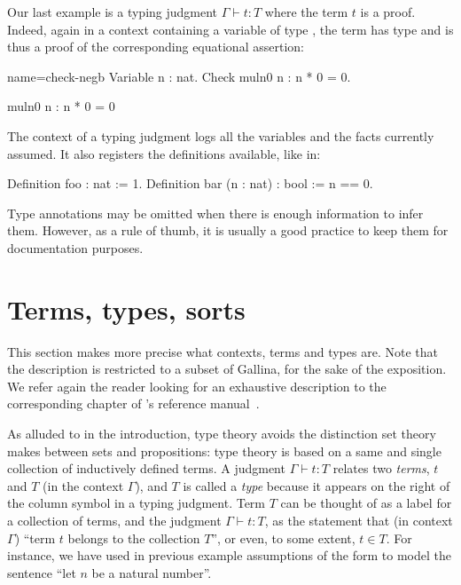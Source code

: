 Our last example is a typing judgment  $\Gamma \vdash t : T$ where
the term $t$ is a proof. Indeed, again in a context containing a
variable  of type , the term
 has type  and is thus a proof of the
corresponding equational assertion:

\begin{coq-left}{name=check-negb}{}
Variable n : nat.
Check muln0 n : n * 0 = 0.

\end{coq-left}
\begin{coqout-right}
muln0 n : n * 0 = 0
\end{coqout-right}

The context of a typing judgment logs all the variables and the facts
currently assumed. It also registers the definitions available, like in:

\begin{coq}{}{}
Definition foo : nat := 1.
Definition bar (n : nat) : bool := n == 0.
\end{coq}
Type annotations may be omitted when there is enough information to
infer them. However, as a rule of thumb, it is usually a good practice
to keep them for documentation purposes.



\section{Terms, types, sorts}\label{sec:terms}

This section makes more precise what contexts, terms and types
are. Note that the description is restricted to a subset of Gallina,
for the sake of the exposition. We refer again the reader looking for
an exhaustive description to the corresponding chapter of \Coq{}'s
reference manual~\cite{Coq:manual}.

As alluded to in the introduction, type theory avoids the distinction
set theory makes between sets and propositions: type theory is based
on a same and single collection of inductively defined terms. A
judgment $\Gamma \vdash t : T$ relates two \emph{terms}, $t$ and $T$ (in the
context $\Gamma$), and $T$ is called a \emph{type} because it appears
on the right of the column symbol in a typing judgment. Term $T$ can be
thought of as a label for a collection of terms, and the judgment
$\Gamma \vdash t : T$, as the statement that (in context $\Gamma$)
``term $t$ belongs to the collection $T$'', or even, to some extent,
$t\in T$. 
For instance, we have used in previous example assumptions of the
form  to model the sentence ``let $n$ be a natural number''.

